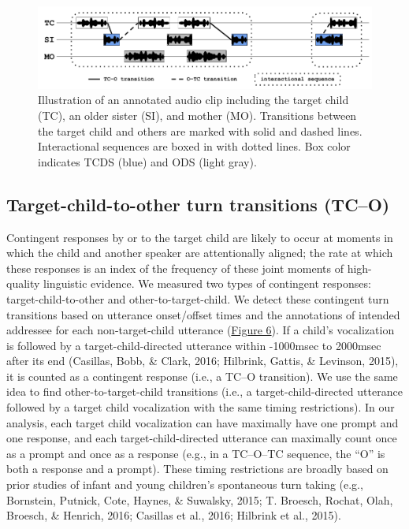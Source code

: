 \documentclass[floatsintext,man]{apa6}
\theoremstyle{definition}
\theoremstyle{definition}
\theoremstyle{definition}
\theoremstyle{remark}
\begin{document}
\begin{figure}

{\centering \includegraphics[width=1\linewidth]{Tseltal-CLE_files/TseltalCLE-TurnTimingIllustration} 

}

\caption{Illustration of an annotated audio clip including the target child (TC), an older sister (SI), and mother (MO). Transitions between the target child and others are marked with solid and dashed lines. Interactional sequences are boxed in with dotted lines. Box color indicates TCDS (blue) and ODS (light gray).}\label{fig:fig6}
\end{figure}

\subsection{Target-child-to-other turn transitions
(TC--O)}\label{target-child-to-other-turn-transitions-tco}

Contingent responses by or to the target child are likely to occur at
moments in which the child and another speaker are attentionally
aligned; the rate at which these responses is an index of the frequency
of these joint moments of high-quality linguistic evidence. We measured
two types of contingent responses: target-child-to-other and
other-to-target-child. We detect these contingent turn transitions based
on utterance onset/offset times and the annotations of intended
addressee for each non-target-child utterance
(\protect\hyperlink{fig6}{Figure 6}). If a child's vocalization is
followed by a target-child-directed utterance within -1000msec to
2000msec after its end (Casillas, Bobb, \& Clark, 2016; Hilbrink,
Gattis, \& Levinson, 2015), it is counted as a contingent response
(i.e., a TC--O transition). We use the same idea to find
other-to-target-child transitions (i.e., a target-child-directed
utterance followed by a target child vocalization with the same timing
restrictions). In our analysis, each target child vocalization can have
maximally have one prompt and one response, and each
target-child-directed utterance can maximally count once as a prompt and
once as a response (e.g., in a TC--O--TC sequence, the \enquote{O} is
both a response and a prompt). These timing restrictions are broadly
based on prior studies of infant and young children's spontaneous turn
taking (e.g., Bornstein, Putnick, Cote, Haynes, \& Suwalsky, 2015; T.
Broesch, Rochat, Olah, Broesch, \& Henrich, 2016; Casillas et al., 2016;
Hilbrink et al., 2015).
\end{document}
